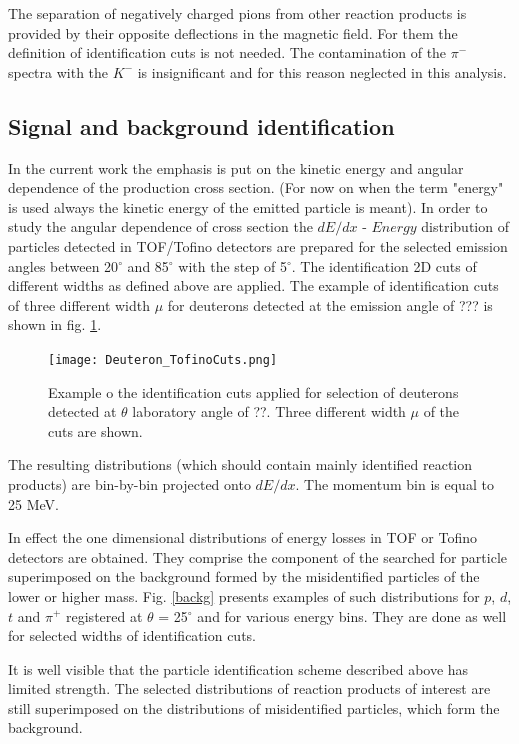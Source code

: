   The separation of negatively charged pions from other reaction products is provided by their opposite deflections in the magnetic field. 
  For them the definition of identification cuts is not needed. The contamination of the $\pi^{-}$ spectra with the $K^{-}$ is insignificant 
  and for this reason neglected in this analysis.


\subsection{\label{Back_sub} Signal and background identification}

In the current work the emphasis is put on the kinetic energy and angular dependence 
of the production cross section.
(For now on when the term "energy" is used always the kinetic energy of the emitted particle is meant).   
In order to study the angular dependence of cross section 
the $dE/dx$ - $Energy$ distribution of particles detected in TOF/Tofino detectors
are prepared for the selected emission angles between 
20$^{\circ}$ and 85$^{\circ}$ with the step of 5$^{\circ}$.
The identification 2D cuts of different widths as defined above are applied. The example of identification cuts of three different width $\mu$ for deuterons detected at the emission angle of  ??? is shown in fig.  \ref{deuteron_cuts_tofino}. \\
\begin{figure}[!h]
    \centering
    \texttt{[image: Deuteron\_TofinoCuts.png]}
    \caption{Example o the identification cuts applied for selection of deuterons detected at $\theta$ laboratory angle of ??. Three different width $\mu$ of the cuts are shown.}
    \label{deuteron_cuts_tofino}
\end{figure}
The resulting distributions (which should contain mainly identified reaction products)  
are bin-by-bin projected onto $dE/dx$. The momentum bin is equal to 25 MeV.

In effect the one dimensional distributions of energy losses in TOF or Tofino detectors are obtained.
They comprise the component of the searched for particle superimposed on the background formed by the 
misidentified particles of the lower or higher mass. Fig. \ref{backg} presents examples of such distributions   
for $p$, $d$, $t$ and $\pi^+$  registered at $\theta$ = 25$^{\circ}$ and for various energy bins.
They are done as well for selected widths of identification cuts.

It is well visible that the particle identification scheme described above has limited strength. 
The selected distributions of reaction products of interest  
are still superimposed on the distributions of misidentified particles, which form the background. 


